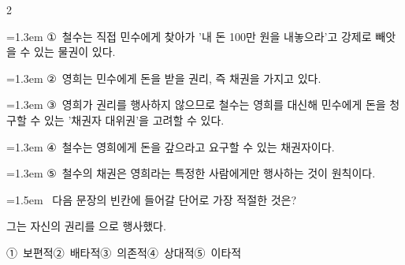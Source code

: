 \documentclass[10pt, a4paper]{article}
\begin{document}
\begin{multicols}{2}
\begin{minipage}{\columnwidth}
\vspace{0.5mm}
{\hangindent=1.3em  \noindent\hspace{0.3em}①~철수는 직접 민수에게 찾아가 '내 돈 100만 원을 내놓으라'고 강제로 빼앗을 수 있는 물권이 있다.\par}
{\hangindent=1.3em  \noindent\hspace{0.3em}②~영희는 민수에게 돈을 받을 권리, 즉 채권을 가지고 있다.\par}
{\hangindent=1.3em  \noindent\hspace{0.3em}③~영희가 권리를 행사하지 않으므로 철수는 영희를 대신해 민수에게 돈을 청구할 수 있는 '채권자 대위권'을 고려할 수 있다.\par}
{\hangindent=1.3em  \noindent\hspace{0.3em}④~철수는 영희에게 돈을 갚으라고 요구할 수 있는 채권자이다.\par}
{\hangindent=1.3em  \noindent\hspace{0.3em}⑤~철수의 채권은 영희라는 특정한 사람에게만 행사하는 것이 원칙이다.\par}
\vspace{4mm}
\end{minipage}
\par

\noindent\begin{minipage}{\columnwidth}
\vspace{2mm}
{\hangindent=1.5em  ~다음 문장의 빈칸에 들어갈 단어로 가장 적절한 것은?\par}

\vspace{1mm}
\begin{boxibox}
그는 자신의 권리를 \underline{\hspace{3cm}}으로 행사했다. \\
\end{boxibox}
\vspace{1mm}

\vspace{0.5mm}
\noindent
\mbox{①~보편적}\hspace{1em}\mbox{②~배타적}\hspace{1em}\mbox{③~의존적}\hspace{1em}\mbox{④~상대적}\hspace{1em}\mbox{⑤~이타적}

\vspace{4mm}
\end{minipage}
\par


\end{multicols}
\end{document}
